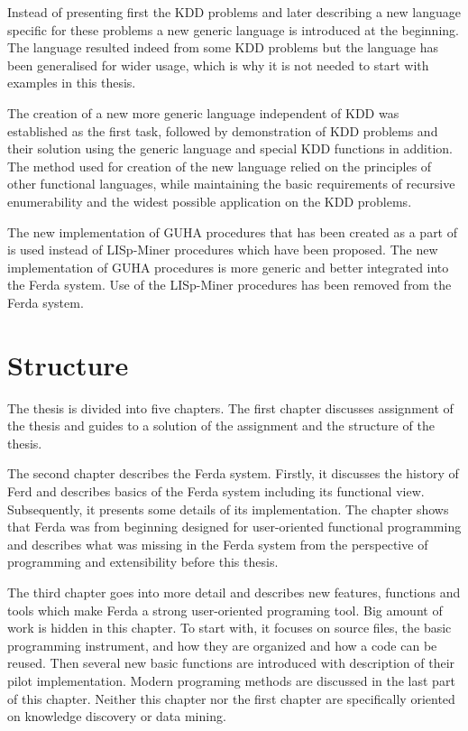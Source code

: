 \documentclass[a4paper,12pt]{book}
\begin{document}
Instead of presenting first the KDD problems and later describing a new language specific for these problems a new generic language is introduced at the beginning. The language resulted indeed from some KDD problems but the language has been generalised for wider usage, which is why it is not needed to start with examples in this thesis.

The creation of a new more generic language independent of KDD was established as the first task, followed by demonstration of KDD problems and their solution using the generic language and special KDD functions in addition. The method used for creation of the new language relied on the principles of other functional languages, while maintaining the basic requirements of recursive enumerability and the widest possible application on the KDD problems.


The new implementation of GUHA procedures that has been created as a part of \cite[diploma thesis of Tomáš Kuchař]{thesisKuchar} is used instead of LISp-Miner procedures which have been proposed. The new implementation of GUHA procedures is more generic and better integrated into the Ferda system. Use of the LISp-Miner procedures has been removed from the Ferda system.

\section{Structure}
The thesis is divided into five chapters. The first chapter discusses assignment of the thesis and guides to a solution of the assignment and the structure of the thesis.

The second chapter describes the Ferda system. Firstly, it discusses the history of Ferd and describes basics of the Ferda system including its functional view. Subsequently, it presents some details of its implementation. The chapter shows that Ferda was from beginning designed for user-oriented functional programming and describes what was missing in the Ferda system from the perspective of programming and extensibility before this thesis.

The third chapter goes into more detail and describes new features, functions and tools which make Ferda a strong user-oriented programing tool. Big amount of work is hidden in this chapter. To start with, it focuses on source files, the basic programming instrument, and how they are organized and how a code can be reused. Then several new basic functions are introduced with description of their pilot implementation. Modern programing methods are discussed in the last part of this chapter. Neither this chapter nor the first chapter are specifically oriented on knowledge discovery or data mining.
\end{document}
